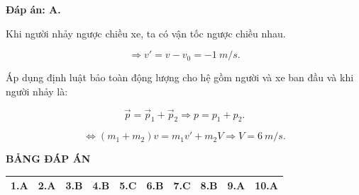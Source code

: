 \begin{enumerate}[label=\bfseries Câu \arabic*:]
	\hideall
	{	
		\textbf{Đáp án: A.}
		
		Khi người nhảy ngược chiều xe, ta có vận tốc ngược chiều nhau.
		
		$$\Rightarrow v' = v - v_0 = - \SI{1}{m/s}.$$
		
		Áp dụng định luật bảo toàn động lượng cho hệ gồm người và xe ban đầu và khi người nhảy là:
		
		$$\vec p = \vec p_1 + \vec p_2 \Rightarrow p = p_1 + p_2.$$
		
		$$\Leftrightarrow (m_1+m_2)v = m_1v'+m_2V \Rightarrow V = \SI{6}{m/s}.$$
		
		
	}
	
\end{enumerate}
\hideall
{
	\begin{center}
		\textbf{BẢNG ĐÁP ÁN}
	\end{center}
	\begin{center}
		\begin{tabular}{|m{2.8em}|m{2.8em}|m{2.8em}|m{2.8em}|m{2.8em}|m{2.8em}|m{2.8em}|m{2.8em}|m{2.8em}|m{2.8em}|}
			\hline
			1.A  & 2.A  & 3.B  & 4.B  & 5.C  & 6.B  & 7.C  & 8.B  & 9.A  & 10.A  \\
			\hline
			
		\end{tabular}
	\end{center}
}

